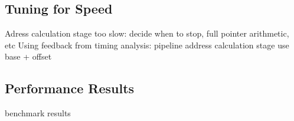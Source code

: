 \documentclass[]{article}
\begin{document}


\subsection{Tuning for Speed} %
\label{sub:tuning_for_speed}

Adress calculation stage too slow: decide when to stop, full pointer arithmetic, etc
Using feedback from timing analysis:
	pipeline address calculation stage
	use base + offset




\subsection{Performance Results} %
\label{sub:performance_results}

benchmark results




\end{document}
